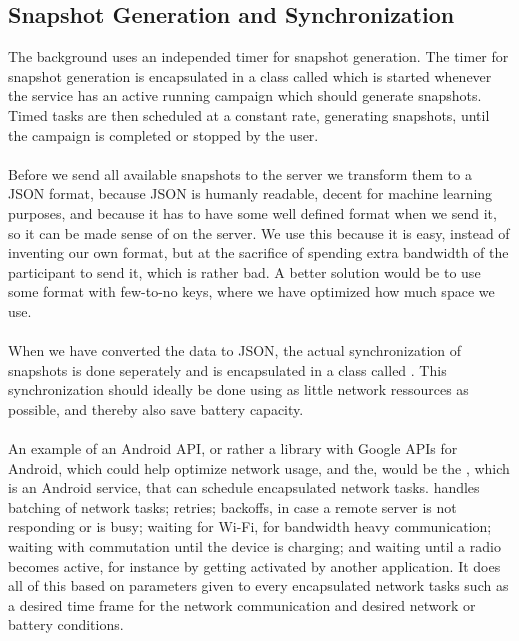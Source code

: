 \subsection{Snapshot Generation and Synchronization}
\label{sub:background_sensor_service_snapshot_generation_and_synchronization}

The background  uses an independed timer for snapshot generation. The timer for snapshot generation is encapsulated in a class called  which is started whenever the service has an active running campaign which should generate snapshots. Timed tasks are then scheduled at a constant rate, generating snapshots, until the campaign is completed or stopped by the user.
\\\\
Before we send all available snapshots to the server we transform them to a JSON format, because JSON is humanly readable, decent for machine learning purposes, and because it has to have some well defined format when we send it, so it can be made sense of on the server. We use this because it is easy, instead of inventing our own format, but at the sacrifice of spending extra bandwidth of the participant to send it, which is rather bad. A better solution would be to use some format with few-to-no keys, where we have optimized how much space we use. 
\\\\
When we have converted the data to JSON, the actual synchronization of snapshots is done seperately and is encapsulated in a class called . This synchronization should ideally be done using as little network ressources as possible, and thereby also save battery capacity. 
\\\\
An example of an Android API, or rather a library with Google APIs for Android, which could help optimize network usage, and the, would be the , which is an Android service, that can schedule encapsulated network tasks.  \parencite{gcmnetworkmanager} handles batching of network tasks; retries; backoffs, in case a remote server is not responding or is busy; waiting for Wi-Fi, for bandwidth heavy communication; waiting with commutation until the device is charging; and waiting until a radio becomes active, for instance by getting activated by another application. It does all of this based on parameters given to every encapsulated network tasks such as a desired time frame for the network communication and desired network or battery conditions.  
